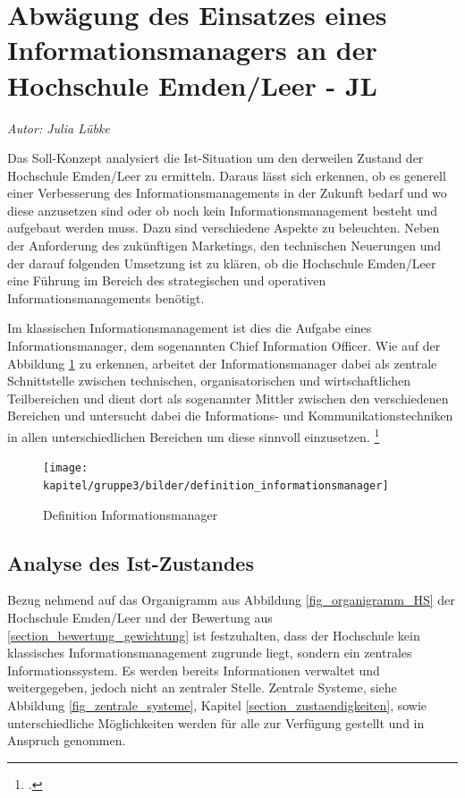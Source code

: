 \section{Abwägung des Einsatzes eines Informationsmanagers an der Hochschule Emden/Leer - JL}

\textit{Autor: Julia Lübke}

Das Soll-Konzept analysiert die Ist-Situation um den derweilen Zustand der  Hochschule Emden/Leer zu ermitteln. Daraus lässt sich erkennen, ob es generell einer Verbesserung des Informationsmanagements in der Zukunft bedarf und wo diese anzusetzen sind oder ob noch kein Informationsmanagement besteht und aufgebaut werden muss. Dazu sind verschiedene Aspekte zu beleuchten. Neben der Anforderung des zukünftigen Marketings, den technischen Neuerungen und der darauf folgenden Umsetzung ist zu klären, ob die Hochschule Emden/Leer eine Führung im Bereich des strategischen und operativen Informationsmanagements benötigt.

Im klassischen Informationsmanagement ist dies die Aufgabe eines Informationsmanager, dem sogenannten Chief Information Officer. Wie auf der Abbildung \ref{fig_def_inm} zu erkennen, arbeitet der Informationsmanager dabei als zentrale Schnittstelle zwischen technischen, organisatorischen und wirtschaftlichen Teilbereichen und dient dort als sogenannter Mittler zwischen den verschiedenen Bereichen und untersucht dabei die Informations- und Kommunikationstechniken in allen unterschiedlichen Bereichen um diese sinnvoll einzusetzen. 
\footcite[86]{definition_informationsmanager}

\begin{figure}[h!]
	\centering
	\texttt{[image: kapitel/gruppe3/bilder/definition\_informationsmanager]}
	\caption{Definition Informationsmanager}
	\label{fig_def_inm}
\end{figure}

\subsection{Analyse des Ist-Zustandes}
\label{subsection_analyse_ist_zustand}

Bezug nehmend auf das Organigramm aus Abbildung \ref{fig_organigramm_HS} der Hochschule Emden/Leer und der Bewertung aus  \ref{section_bewertung_gewichtung} ist festzuhalten, dass der Hochschule kein klassisches Informationsmanagement zugrunde liegt, sondern ein zentrales Informationssystem. Es werden bereits Informationen verwaltet und weitergegeben, jedoch nicht an zentraler Stelle. Zentrale Systeme, siehe Abbildung \ref{fig_zentrale_systeme}, Kapitel \ref{section_zustaendigkeiten}, sowie unterschiedliche Möglichkeiten werden für alle zur Verfügung gestellt und in Anspruch genommen. 

